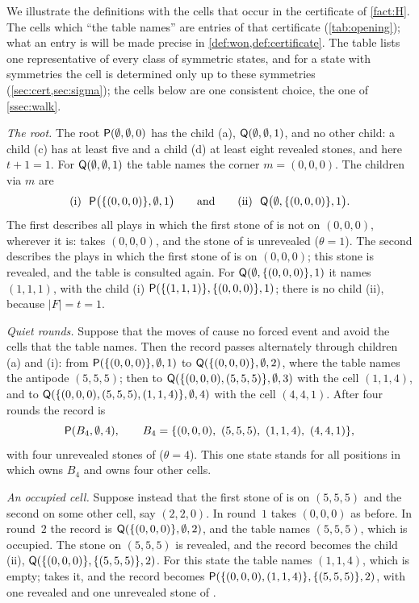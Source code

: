 \begin{example}\label{ex:first-rounds}
We illustrate the definitions with the cells that occur in the certificate of \cref{fact:H}. The cells
which ``the table names'' are entries of that certificate (\cref{tab:opening}); what an entry is will be
made precise in \cref{def:won,def:certificate}. The table lists one representative of every class of
symmetric states, and for a state with symmetries the cell is determined only up to these symmetries
(\cref{sec:cert,sec:sigma}); the cells below are one consistent choice, the one of \cref{ssec:walk}.

\smallskip\noindent\emph{The root.} The root $\mathsf{P}(\emptyset,\emptyset,0)$ has the child \textup{(a)},
$\mathsf{Q}(\emptyset,\emptyset,1)$, and no other child: a child \textup{(c)} has at least five and a child
\textup{(d)} at least eight revealed stones, and here $t+1=1$. For $\mathsf{Q}(\emptyset,\emptyset,1)$ the table
names the corner $m=(0,0,0)$. The children via $m$ are
\[ \textup{(i)}\ \ \Pst\bigl(\{(0,0,0)\},\emptyset,1\bigr)\qquad\text{and}\qquad
   \textup{(ii)}\ \ \Qst\bigl(\emptyset,\{(0,0,0)\},1\bigr). \]
The first describes all plays in which the first stone of \Maker{} is not on $(0,0,0)$, wherever it is:
\Breaker{} takes $(0,0,0)$, and the stone of \Maker{} is unrevealed ($\theta=1$). The second describes the
plays in which the first stone of \Maker{} is on $(0,0,0)$; this stone is revealed, and the table is consulted
again. For $\mathsf{Q}(\emptyset,\{(0,0,0)\},1)$ it names $(1,1,1)$, with the child \textup{(i)}
$\mathsf{P}(\{(1,1,1)\},\{(0,0,0)\},1)$; there is no child \textup{(ii)}, because $|F|=t=1$.

\smallskip\noindent\emph{Quiet rounds.} Suppose that the moves of \Maker{} cause no forced event and avoid the
cells that the table names. Then the record passes alternately through children \textup{(a)} and
\textup{(i)}: from $\mathsf{P}(\{(0,0,0)\},\emptyset,1)$ to $\mathsf{Q}(\{(0,0,0)\},\emptyset,2)$, where the table names
the antipode $(5,5,5)$; then to $\mathsf{Q}(\{(0,0,0),(5,5,5)\},\emptyset,3)$ with the cell $(1,1,4)$, and to
$\mathsf{Q}(\{(0,0,0),(5,5,5),(1,1,4)\},\emptyset,4)$ with the cell $(4,4,1)$. After four rounds the record is
\[ \Pst(B_4,\emptyset,4),\qquad B_4=\{(0,0,0),\ (5,5,5),\ (1,1,4),\ (4,4,1)\}, \]
with four unrevealed stones of \Maker{} ($\theta=4$). This one state stands for all positions in which
\Breaker{} owns $B_4$ and \Maker{} owns four other cells.

\smallskip\noindent\emph{An occupied cell.} Suppose instead that the first stone of \Maker{} is on $(5,5,5)$
and the second on some other cell, say $(2,2,0)$. In round~$1$ \Breaker{} takes $(0,0,0)$ as before. In
round~$2$ the record is $\mathsf{Q}(\{(0,0,0)\},\emptyset,2)$, and the table names $(5,5,5)$, which is occupied.
The stone on $(5,5,5)$ is revealed, and the record becomes the child \textup{(ii)},
$\mathsf{Q}(\{(0,0,0)\},\{(5,5,5)\},2)$. For this state the table names $(1,1,4)$, which is empty; \Breaker{}
takes it, and the record becomes $\mathsf{P}(\{(0,0,0),(1,1,4)\},\{(5,5,5)\},2)$, with one revealed and one
unrevealed stone of \Maker.


\end{example}
